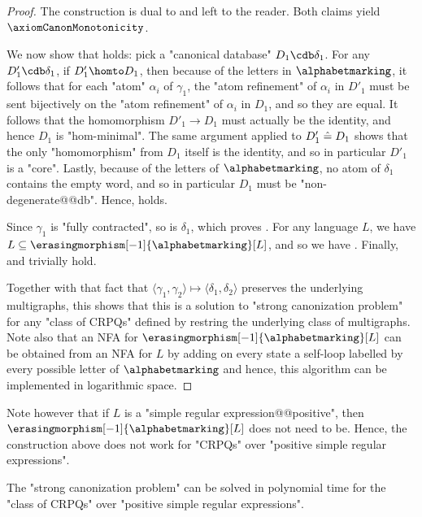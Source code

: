 \begin{proof}
	The construction is dual to  and left to the
	reader. Both claims yield $\axiomCanonMonotonicity$.

	We now show that \axiomStrongCanonCore{} holds: pick a "canonical database" $D_1 \cdb \delta_1$.
	For any $D'_1 \cdb \delta_1$, if $D'_1 \homto D_1$, then because of the letters in $\alphabetmarking$,
	it follows that for each "atom" $\alpha_i$ of $\gamma_1$, the "atom refinement" of
	$\alpha_i$ in $D'_1$ must be sent bijectively on the "atom refinement" of $\alpha_i$ in $D_1$,
	and so they are equal. It follows that the homomorphism $D'_1 \to D_1$ must actually be the identity,
	and hence $D_1$ is "hom-minimal".
	The same argument applied to $D'_1 \mathrel{\hat{=}} D_1$ shows that the only "homomorphism" from $D_1$ itself
	is the identity, and so in particular $D'_1$ is a "core".
	Lastly, because of the letters of $\alphabetmarking$, no atom of $\delta_1$ contains the empty word,
	and so in particular $D_1$ must be "non-degenerate@@db". Hence, \axiomStrongCanonCore{} holds.

	Since $\gamma_1$ is "fully contracted", so is $\delta_1$, which proves \axiomCanonContracted{}.
	For any language $L$, we have $L \subseteq \erasingmorphism[-1]{\alphabetmarking}[L]$, and so we have \axiomCanonContainment{}.
	Finally, \axiomCanonNonRed{} and \axiomCanonMarking{} trivially hold.
	
	Together with that fact that
	$\langle \gamma_1,\gamma_2 \rangle \mapsto \langle \delta_1, \delta_2\rangle$ preserves
	the underlying multigraphs, this shows that this is a solution to "strong canonization problem"
	for any "class of CRPQs" defined by restring the underlying class of multigraphs.
	Note also that an NFA for $\erasingmorphism[-1]{\alphabetmarking}[L]$ can be obtained
	from an NFA for $L$ by adding on every state a self-loop labelled by every possible letter of $\alphabetmarking$
	and hence, this algorithm can be implemented in logarithmic space.
\end{proof}

Note however that if $L$ is a "simple regular expression@@positive", then
$\erasingmorphism[-1]{\alphabetmarking}[L]$ does not need to be.
Hence, the construction above does not work for "CRPQs" over "positive simple regular expressions".

\begin{lemma}
	\AP\label{lem:canonization-SREs}
	The "strong canonization problem" can be solved in polynomial time
	for the "class of CRPQs" over "positive simple regular expressions".
\end{lemma}

